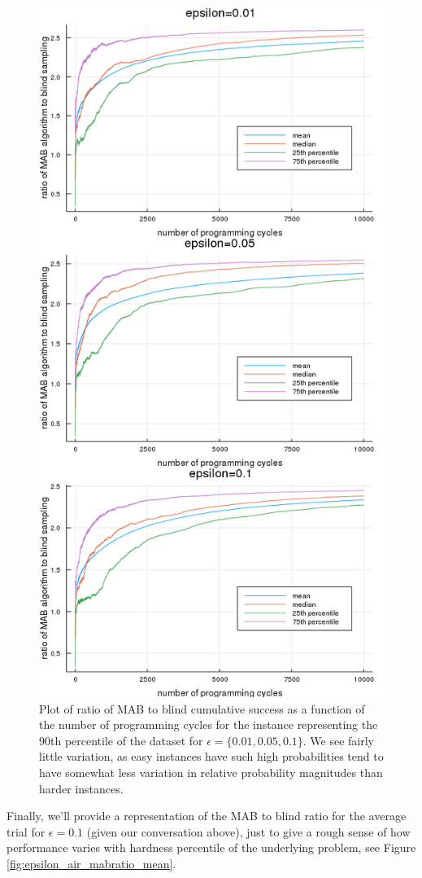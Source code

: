 \begin{figure}
    \includegraphics[width=0.7\columnwidth]{epsilon_inst13_air_eps_comp.png}
    \caption{Plot of ratio of MAB to blind cumulative success as a function of the number of programming cycles for the instance representing the 90th percentile of the dataset for $\epsilon=\{0.01,0.05,0.1\}$. We see fairly little variation, as easy instances have such high probabilities tend to have somewhat less variation in relative probability magnitudes than harder instances.}
    \label{fig:epsilon_inst13_air_eps_comp}
\end{figure}

Finally, we'll provide a representation of the MAB to blind ratio for the average trial for $\epsilon=0.1$ (given our conversation above), just to give a rough sense of how performance varies with hardness percentile of the underlying problem, see Figure \ref{fig:epsilon_air_mabratio_mean}.

